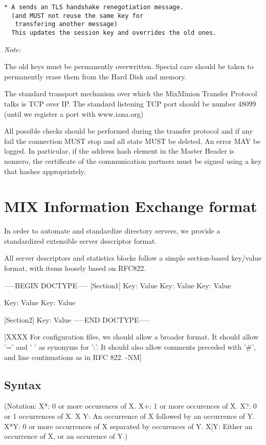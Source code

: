 \begin{verbatim}
* A sends an TLS handshake renegotiation message.
  (and MUST not reuse the same key for 
   transfering another message)
  This updates the session key and overrides the old ones.
\end{verbatim}

\emph{Note:}

The old keys must be permanently overwritten. Special care should be
taken to permanently erase them from the Hard Disk and memory. 

The standard transport mechanism over which the MixMinion Transfer
Protocol talks is TCP over IP. The standard listening TCP port should be 
number 48099 (until we register a port with www.iana.org)

All possible checks should be performed during the transfer protocol
and if any fail the connection MUST stop and all state MUST
be deleted. An error MAY be logged. In particular, if the address
hash element in the Master Header is nonzero, the certificate of
the communication partners must be signed using a key that hashes
appropriately.

\section{MIX Information Exchange format}

In order to automate and standardize directory servers, we provide 
a standardized extensible server descriptor format.

All server descriptors and statistics blocks follow a simple
section-based key/value format, with items loosely based on RFC822.

-----BEGIN DOCTYPE-----
[Section1]
Key: Value
Key: Value
Key: Value

Key: Value
Key: Value

[Section2]
Key: Value
-----END DOCTYPE-----

[XXXX For configuration files, we should allow a broader format.  It
  should allow '=' and ' ' as synonyms for ':'.  It should also allow
  comments preceded with '#', and line continuations as in RFC 822. -NM]

\subsection{Syntax}

(Notation:  X*: 0 or more occurences of X.
            X+: 1 or more occurences of X.
	    X?: 0 or 1 occurrences of X.
            X Y: An occurrence of X followed by an occurrence of Y.
	    X*{Y}: 0 or more occurrences of X separated by occurences
                  of Y.
            X|Y: Either an occurrence of X, or an occurence of Y.)

